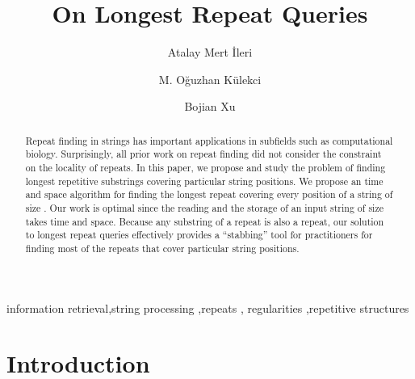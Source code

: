 \documentclass[preprint]{elsarticle}
\begin{document}
\begin{frontmatter}

  \title{On Longest Repeat Queries}


\author[a1]{Atalay Mert \.{I}leri}
\address[a1]{Massachusetts Institute of Technology, USA}

\author[a2]{M. O\u{g}uzhan  K\"{u}lekci}
\address[a2]{Istanbul Medipol University, Turkey}

\author[a3]{Bojian Xu} 
\address[a3]{
Eastern Washington University, USA}
 



\begin{abstract} 
  Repeat finding in strings has important applications in subfields
  such as computational biology. Surprisingly, all prior work on
  repeat finding did not consider the constraint on the locality of
  repeats. In this paper, we propose and study the problem of finding
  longest repetitive substrings covering particular string positions.
  We propose an  time and space algorithm for finding the
  longest repeat covering every position of a string of size . Our
  work is optimal since the reading and the storage of an input string
  of size  takes  time and space.  Because any
  substring of a repeat is also a repeat, our solution to longest
  repeat queries effectively provides a ``stabbing'' tool for
  practitioners for finding most of the repeats that cover particular string
  positions.
 \end{abstract}







\begin{keyword}
   information retrieval\sep string processing \sep repeats \sep
   regularities \sep repetitive structures
 \end{keyword}


\end{frontmatter}



\section{Introduction}
\end{document}
